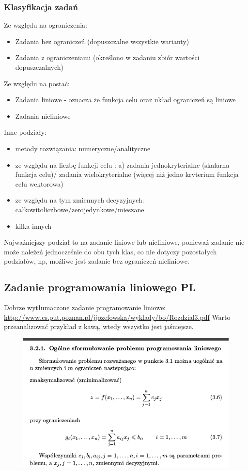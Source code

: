 \documentclass[a4paper,twoside]{report}
\begin{document}
\subsubsection{Klasyfikacja zadań}
Ze względu na ograniczenia:
\begin{itemize}
	\item Zadania bez ograniczeń (dopuszczalne wszystkie warianty)
	\item Zadania z ograniczeniami (określono w zadaniu zbiór wartości dopuszczalnych)
\end{itemize}
Ze względu na postać:
\begin{itemize}
	\item Zadania liniowe - oznacza że funkcja celu oraz układ ograniczeń są liniowe
	\item Zadania nieliniowe 
\end{itemize}
Inne podziały: 
\begin{itemize}
	\item metody rozwiązania: numeryczne/analityczne
	\item ze względu na liczbę funkcji celu :
	a) zadania jednokryterialne (skalarna funkcja celu)/
	zadania wielokryterialne (więcej niż jedno kryterium  funkcja celu wektorowa)
	\item ze względu na tym zmiennych decyzyjnych: całkowitoliczbowe/zerojedynkowe/mieszane
	\item kilka innych 
\end{itemize}

Najważniejszy podział to na zadanie liniowe lub nieliniowe, ponieważ zadanie nie może należeń jednocześnie do obu tych klas, co nie dotyczy pozostałych podziałów, np, możliwe jest zadanie bez ograniczeń nieliniowe. 


\subsection{Zadanie programowania liniowego PL} 

Dobrze wytłumaczone zadanie programowanie liniowe:\\
\url{http://www.cs.put.poznan.pl/jjozefowska/wyklady/bo/Rozdzial3.pdf}
Warto przeanalizować przykład z kawą, wtedy wszystko jest jaśniejsze. 


\begin{figure}[H]
	\includegraphics[scale=1
	]{obrazy/optymalizacja/opt3.png}
\end{figure}
\end{document}
